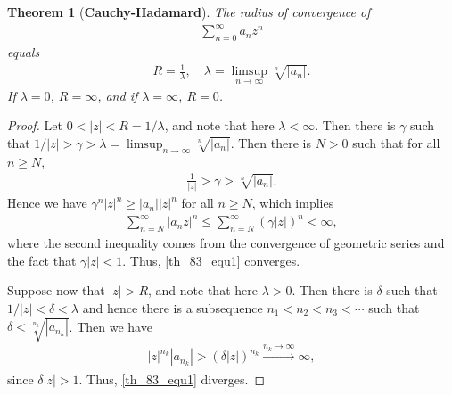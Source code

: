 \documentclass[11pt]{book}
\newtheorem{theorem}{Theorem}[chapter]
\theoremstyle{definition}
\numberwithin{equation}{chapter}
\begin{document}
\begin{theorem}[{\bf Cauchy-Hadamard}]\label{th_83}
The radius of convergence of 
\begin{align}\label{th_83_equ1}
    \sum^\infty_{n=0} a_n z^n
\end{align}
equals
\begin{align*}
    R = \frac{1}{\lambda}, \quad \lambda = \limsup_{n\to\infty} \sqrt[n]{\left|a_n\right|}.
\end{align*}
If $\lambda = 0$, $R = \infty$, and if $\lambda = \infty$, $R = 0$.
\end{theorem}
\begin{proof}
Let $0 < \left|z\right| < R = 1/\lambda$, and note that here $\lambda < \infty$. Then there is $\gamma$ such that $1/\left|z\right| > \gamma > \lambda = \limsup_{n\to\infty} \sqrt[n]{\left|a_n\right|}$. Then there is $N > 0$ such that for all $n \geq N$,
\begin{align*}
    \frac{1}{\left|z\right|} > \gamma > \sqrt[n]{\left|a_n\right|}.
\end{align*}
Hence we have $\gamma^n \left|z\right|^n \geq \left|a_n\right| \left|z\right|^n$ for all $n \geq N$, which implies 
\begin{align*}
    \sum^\infty_{n=N} \left|a_n z\right|^n \leq \sum^\infty_{n=N} (\gamma\left| z\right|)^n < \infty,
\end{align*}
where the second inequality comes from the convergence of geometric series and the fact that $\gamma\left| z\right| < 1$. Thus, \eqref{th_83_equ1} converges.

Suppose now that $\left|z\right| > R$, and note that here $\lambda > 0$. Then there is $\delta$ such that $1/\left|z\right| < \delta < \lambda$ and hence there is a subsequence $n_1 < n_2 < n_3 < \cdots$ such that $\delta < \sqrt[n_k]{\left|a_{n_k}\right|}$. Then we have 
\begin{align*}
    \left|z\right|^{n_k} \left|a_{n_k}\right| > (\delta \left|z\right|)^{n_k} \xrightarrow[]{n_k \to \infty} \infty,
\end{align*}
since $\delta \left|z\right| > 1$. Thus, \eqref{th_83_equ1} diverges.
\end{proof}

\medskip
\end{document}
